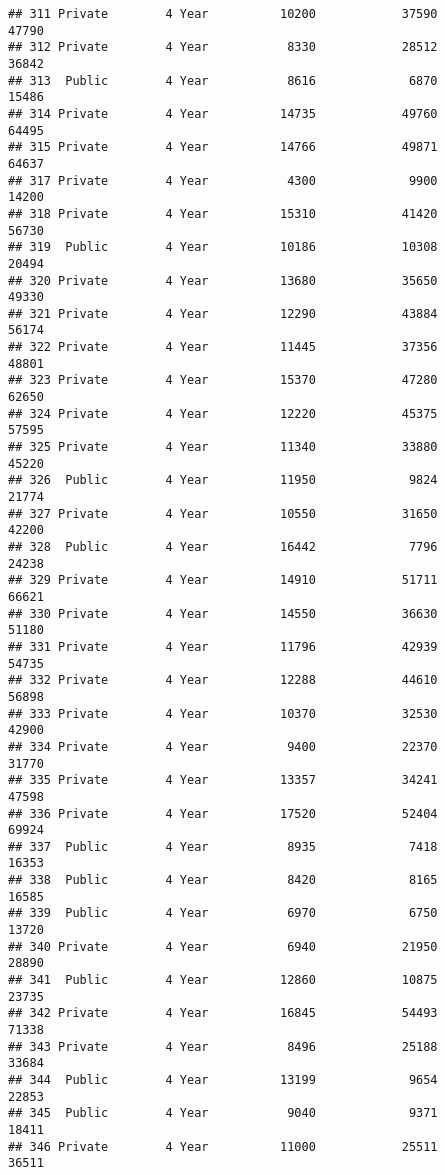 \documentclass[
]{article}
\begin{document}
\begin{verbatim}
## 311 Private        4 Year          10200            37590          47790
## 312 Private        4 Year           8330            28512          36842
## 313  Public        4 Year           8616             6870          15486
## 314 Private        4 Year          14735            49760          64495
## 315 Private        4 Year          14766            49871          64637
## 317 Private        4 Year           4300             9900          14200
## 318 Private        4 Year          15310            41420          56730
## 319  Public        4 Year          10186            10308          20494
## 320 Private        4 Year          13680            35650          49330
## 321 Private        4 Year          12290            43884          56174
## 322 Private        4 Year          11445            37356          48801
## 323 Private        4 Year          15370            47280          62650
## 324 Private        4 Year          12220            45375          57595
## 325 Private        4 Year          11340            33880          45220
## 326  Public        4 Year          11950             9824          21774
## 327 Private        4 Year          10550            31650          42200
## 328  Public        4 Year          16442             7796          24238
## 329 Private        4 Year          14910            51711          66621
## 330 Private        4 Year          14550            36630          51180
## 331 Private        4 Year          11796            42939          54735
## 332 Private        4 Year          12288            44610          56898
## 333 Private        4 Year          10370            32530          42900
## 334 Private        4 Year           9400            22370          31770
## 335 Private        4 Year          13357            34241          47598
## 336 Private        4 Year          17520            52404          69924
## 337  Public        4 Year           8935             7418          16353
## 338  Public        4 Year           8420             8165          16585
## 339  Public        4 Year           6970             6750          13720
## 340 Private        4 Year           6940            21950          28890
## 341  Public        4 Year          12860            10875          23735
## 342 Private        4 Year          16845            54493          71338
## 343 Private        4 Year           8496            25188          33684
## 344  Public        4 Year          13199             9654          22853
## 345  Public        4 Year           9040             9371          18411
## 346 Private        4 Year          11000            25511          36511

\end{verbatim}
\end{document}
